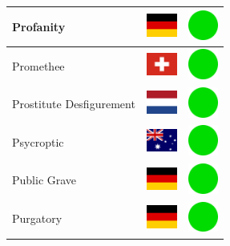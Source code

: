 \documentclass[12pt, a4paper, twoside]{report}
\begin{document}
\begin{center}
\begin{longtable}{|p{5cm}|p{2cm}|p{2cm}|}
 Profanity                                                  & \includegraphics[width=1cm]{../img/flags/de} &   \includegraphics[width=1cm]{../likes/y} \\ \hline
 Promethee                                                  & \includegraphics[width=1cm]{../img/flags/ch} &   \includegraphics[width=1cm]{../likes/y} \\ \hline
 Prostitute Desfigurement                                   & \includegraphics[width=1cm]{../img/flags/nl} &   \includegraphics[width=1cm]{../likes/y} \\ \hline
 Psycroptic                                                 & \includegraphics[width=1cm]{../img/flags/au} &   \includegraphics[width=1cm]{../likes/y} \\ \hline
 Public Grave                                               & \includegraphics[width=1cm]{../img/flags/de} &   \includegraphics[width=1cm]{../likes/y} \\ \hline
 Purgatory                                                  & \includegraphics[width=1cm]{../img/flags/de} &   \includegraphics[width=1cm]{../likes/y} \\ \hline

\end{longtable}
\end{center}
\end{document}
